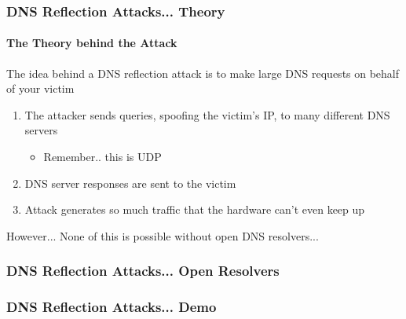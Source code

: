 \documentclass{beamer}
\begin{document}
\begin{frame}
	\frametitle{DNS Reflection Attacks... Theory}
	\framesubtitle{The Theory behind the Attack}
	The idea behind a DNS reflection attack is to make large DNS requests on
	behalf of your victim
	\begin{enumerate}
		\item The attacker sends queries, spoofing the victim's IP, to many
			different DNS servers
			\begin{itemize}
				\item Remember.. this is UDP
			\end{itemize}
		\item DNS server responses are sent to the victim
		\item Attack generates so much traffic that the hardware can't even keep up
	\end{enumerate}
	However... None of this is possible without open DNS resolvers...
\end{frame}

\begin{frame}[fragile]
	\frametitle{DNS Reflection Attacks... Open Resolvers}
\end{frame}
\begin{frame}
	\frametitle{DNS Reflection Attacks... Demo}
\end{frame}
\end{document}
